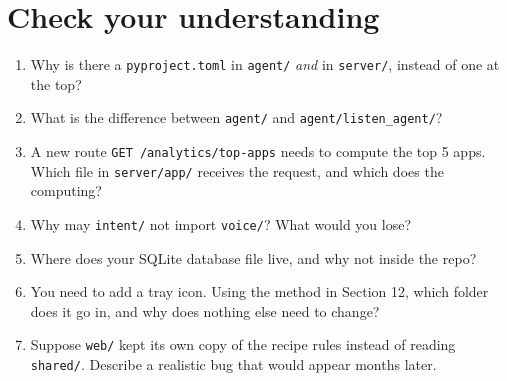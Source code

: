 \documentclass[11pt,a4paper]{article}
\begin{document}
\section{Check your understanding}
\begin{exercise}
\begin{enumerate}
  \item Why is there a \texttt{pyproject.toml} in \texttt{agent/} \emph{and} in
        \texttt{server/}, instead of one at the top?
  \item What is the difference between \texttt{agent/} and \texttt{agent/listen\_agent/}?
  \item A new route \texttt{GET /analytics/top-apps} needs to compute the top 5 apps. Which
        file in \texttt{server/app/} receives the request, and which does the computing?
  \item Why may \texttt{intent/} not import \texttt{voice/}? What would you lose?
  \item Where does your SQLite database file live, and why not inside the repo?
  \item You need to add a tray icon. Using the method in Section 12, which folder does it go
        in, and why does nothing else need to change?
  \item Suppose \texttt{web/} kept its own copy of the recipe rules instead of reading
        \texttt{shared/}. Describe a realistic bug that would appear months later.
\end{enumerate}
\end{exercise}
\end{document}
